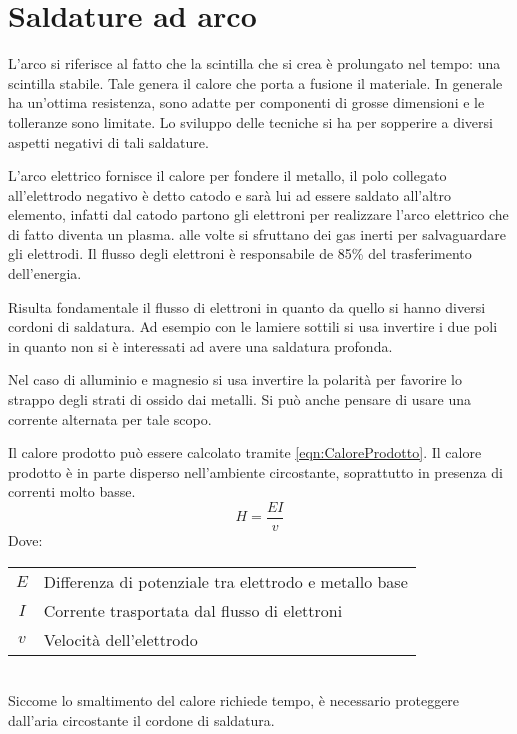 \section{Saldature ad arco}
L'arco si riferisce al fatto che la scintilla che si crea è prolungato nel tempo: una scintilla stabile.
Tale genera il calore che porta a fusione il materiale.
In generale ha un'ottima resistenza, sono adatte per componenti di grosse dimensioni e le tolleranze sono limitate.
Lo sviluppo delle tecniche si ha per sopperire a diversi aspetti negativi di tali saldature.

L'arco elettrico fornisce il calore per fondere il metallo, il polo collegato all'elettrodo negativo è detto catodo e sarà lui ad essere saldato all'altro elemento, infatti dal catodo partono gli elettroni per realizzare l'arco elettrico che di fatto diventa un plasma.
alle volte si sfruttano dei gas inerti per salvaguardare gli elettrodi.
Il flusso degli elettroni è responsabile de 85\% del trasferimento dell'energia. 

\begin{figure}
\centering
{}\quad
{}
\end{figure}

Risulta fondamentale il flusso di elettroni in quanto da quello si hanno diversi cordoni di saldatura.
Ad esempio con le lamiere sottili si usa invertire i due poli in quanto non si è interessati ad avere una saldatura profonda.

Nel caso di alluminio e magnesio si usa invertire la polarità per favorire lo strappo degli strati di ossido dai metalli.
Si può anche pensare di usare una corrente alternata per tale scopo.

Il calore prodotto può essere calcolato tramite \eqref{eqn:CaloreProdotto}.
Il calore prodotto è in parte disperso nell'ambiente circostante, soprattutto in presenza di correnti molto basse.
\begin{equation}
H = \frac{E I}{v} \label{eqn:CaloreProdotto}
\end{equation}
Dove:\\
\begin{tabular}{cl}
$E$ & Differenza di potenziale tra elettrodo e metallo base\\
$I$ & Corrente trasportata dal flusso di elettroni\\
$v$ & Velocità dell'elettrodo
\end{tabular}\\
Siccome lo smaltimento del calore richiede tempo, è necessario proteggere dall'aria circostante il cordone di saldatura.

